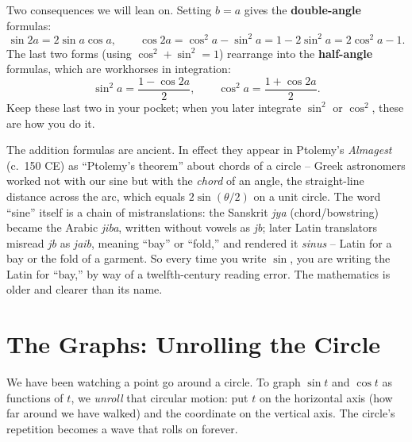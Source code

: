 Two consequences we will lean on. Setting $b = a$ gives the \textbf{double-angle} formulas:
\[
  \sin 2a = 2\sin a\cos a,\qquad
  \cos 2a = \cos^2 a - \sin^2 a = 1 - 2\sin^2 a = 2\cos^2 a - 1.
\]
The last two forms (using $\cos^2 + \sin^2 = 1$) rearrange into the \textbf{half-angle} formulas, which are workhorses in integration:
\[
  \sin^2 a = \frac{1 - \cos 2a}{2},\qquad
  \cos^2 a = \frac{1 + \cos 2a}{2}.
\]
Keep these last two in your pocket; when you later integrate $\sin^2$ or $\cos^2$, these are how you do it.

\begin{historybox}
The addition formulas are ancient. In effect they appear in Ptolemy's \emph{Almagest} (c.\ 150 CE) as ``Ptolemy's theorem'' about chords of a circle -- Greek astronomers worked not with our sine but with the \emph{chord} of an angle, the straight-line distance across the arc, which equals $2\sin(\theta/2)$ on a unit circle. The word ``sine'' itself is a chain of mistranslations: the Sanskrit \emph{jya} (chord/bowstring) became the Arabic \emph{jiba}, written without vowels as \emph{jb}; later Latin translators misread \emph{jb} as \emph{jaib}, meaning ``bay'' or ``fold,'' and rendered it \emph{sinus} -- Latin for a bay or the fold of a garment. So every time you write $\sin$, you are writing the Latin for ``bay,'' by way of a twelfth-century reading error. The mathematics is older and clearer than its name.
\end{historybox}

\section{The Graphs: Unrolling the Circle}
\label{ch04:graphs}

We have been watching a point go around a circle. To graph $\sin t$ and $\cos t$ as functions of $t$, we \emph{unroll} that circular motion: put $t$ on the horizontal axis (how far around we have walked) and the coordinate on the vertical axis. The circle's repetition becomes a wave that rolls on forever.

